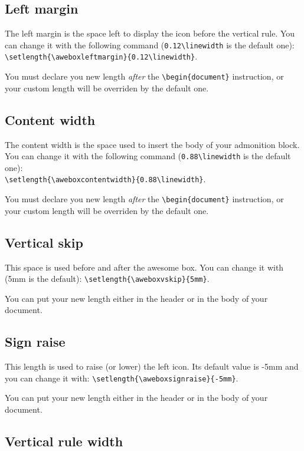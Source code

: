 \documentclass[a4paper,12pt]{article}
\begin{document}
\subsection{Left margin}

The left margin is the space left to display the icon before the
vertical rule. You can change it with the following command
(\verb!0.12\linewidth! is the default one):\\
\verb!\setlength{\aweboxleftmargin}{0.12\linewidth}!.

You must declare you new length \emph{after} the \verb!\begin{document}!
instruction, or your custom length will be overriden by the default
one.

\subsection{Content width}

The content width is the space used to insert the body of your
admonition block. You can change it with the following command
(\verb!0.88\linewidth! is the default one):\\
\verb!\setlength{\aweboxcontentwidth}{0.88\linewidth}!.

You must declare you new length \emph{after} the \verb!\begin{document}!
instruction, or your custom length will be overriden by the default
one.

\subsection{Vertical skip}

This space is used before and after the awesome box. You can change it
with (5mm is the default): \verb!\setlength{\aweboxvskip}{5mm}!.

You can put your new length either in the header or in the body of your
document.

\subsection{Sign raise}

This length is used to raise (or lower) the left icon. Its default value
is -5mm and you can change it with:
\verb!\setlength{\aweboxsignraise}{-5mm}!.

You can put your new length either in the header or in the body of your
document.

\subsection{Vertical rule width}
\end{document}
